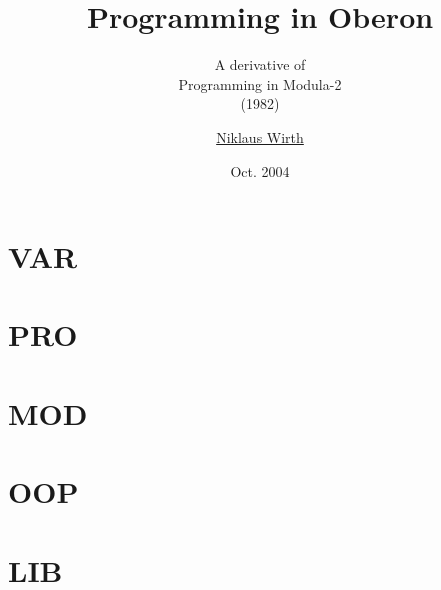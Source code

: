 \documentclass[a5paper]{scrbook}
\title{Programming in Oberon}
\subtitle{A derivative of\\Programming in Modula-2\\(1982)}
\author{\href{https://people.inf.ethz.ch/wirth/}{Niklaus Wirth}}
\date{Oct. 2004}
\begin{document}
\maketitle

\part{VAR}









\part{PRO}









\part{MOD}




\part{OOP}

\appendix
\part*{LIB}


\end{document}
